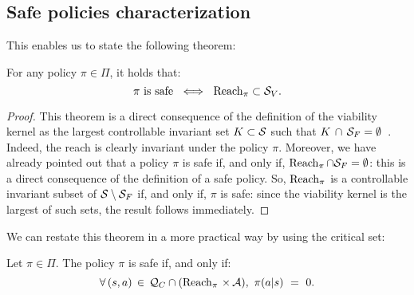 \subsection{Safe policies characterization} \label{sec:safe policies characterization}
This enables us to state the following theorem:
\begin{theorem}
	For any policy $\pi\in\Pi$, it holds that:
	\begin{equation}
		\pi\text{ is safe}~\iff~\reach_\pi\subset\SV. \label{eq:safe policies stabilize sv}
	\end{equation}
	\label{thm:safe policies stabilize sv}
\end{theorem}
\begin{proof}
	This theorem is a direct consequence of the definition of the viability kernel as the largest controllable invariant set $K \subset\S$ such that $K \,\cap\,\SF=\emptyset$~\cite[Definition\,4.1.1]{aubin2011viability}. Indeed, the reach is clearly invariant under the policy $\pi$. Moreover, we have already pointed out that a policy $\pi$ is safe if, and only if, $\reach_\pi\cap\SF = \emptyset$: this is a direct consequence of the definition of a safe policy. So, $\reach_\pi$ is a controllable invariant subset of $\S\setminus\SF$ if, and only if, $\pi$ is safe: since the viability kernel is the largest of such sets, the result follows immediately.
\end{proof}
We can restate this theorem in a more practical way by using the critical set:
\begin{corollary} \label{clry:safe policies on qc}
	Let $\pi\in\Pi$. The policy $\pi$ is safe if, and only if:
	\begin{equation}
		\forall\,(s, a)\,\in\, \QC \cap (\reach_\pi\,\times\,\A),~\pi(a|s)~=~0. \label{eq:safe policies on qc}
	\end{equation}
\end{corollary}
